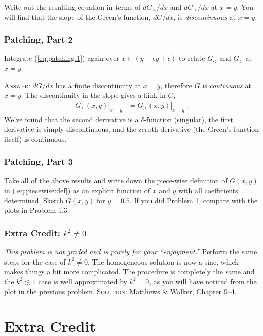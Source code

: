 \documentclass[12pt]{article}
\numberwithin{equation}{subsection}    %
\begin{document}
Write out the resulting equation in terms of $dG_</dx$ and $dG_>/dx$ at $x=y$. You will find that the slope of the Green's function, $dG/dx$, is \emph{discontinuous} at $x=y$. 


\subsubsection{Patching, Part 2}

Integrate (\ref{eq:patching:1}) again over $x\in(y-\epsilon y+\epsilon)$ to relate $G_<$ and $G_>$ at $x=y$.


\textsc{Answer}: $dG/dx$ has a finite discontinuity at $x=y$, therefore $G$ is \emph{continuous} at $x=y$. The discontinuity in the slope gives a kink in $G$,
\begin{align}
	\left.G_<(x, y)\right|_{x=y} &= \left.G_>(x, y)\right|_{x=y} \ .
\end{align}
We've found that the second derivative is a $\delta$-function (singular), the first derivative is simply discontinuous, and the zeroth derivative (the Green's function itself) is continuous.

\subsubsection{Patching, Part 3}

Take all of the above results and write down the piece-wise definition of $G(x,y)$ in (\ref{eq:piecewise:def}) as an explicit function of $x$ and $y$ with all coefficients determined. Sketch $G(x,y)$  for $y=0.5$. If you did Problem 1, compare with the plots in Problem 1.3.

\subsubsection{Extra Credit: $k^2\neq 0$}

\emph{This problem is not graded and is purely for your ``enjoyment.''} Perform the same steps for the case of $k^2\neq 0$. The homogeneous solution is now a sine, which makes things a bit more complicated. The procedure is completely the same and the $k^2 \lesssim 1$ case is well approximated by $k^2=0$, as you will have noticed from the plot in the previous problem. \textsc{Solution}: Matthews \& Walker, Chapter 9--4. 










\section{Extra Credit}
\end{document}
